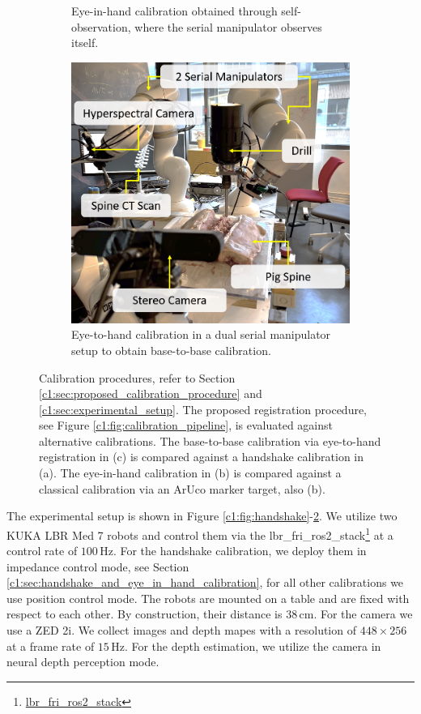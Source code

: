 \begin{figure}
\begin{subfigure}[b]{0.3\textwidth}
         \caption{Eye-in-hand calibration obtained through self-observation, where the serial manipulator observes itself.}
         \label{c1:fig:eye_in_hand}
     \end{subfigure}
     \hfill
     \begin{subfigure}[b]{0.3\textwidth}
         \centering
         \includegraphics[width=\textwidth]{fig/eye_to_hand.png}
         \caption{Eye-to-hand calibration in a dual serial manipulator setup to obtain base-to-base calibration.}
         \label{c1:fig:eye_to_hand}
     \end{subfigure}
    \caption{Calibration procedures, refer to Section \ref{c1:sec:proposed_calibration_procedure} and \ref{c1:sec:experimental_setup}. The proposed registration procedure, see Figure \ref{c1:fig:calibration_pipeline}, is evaluated against alternative calibrations. The base-to-base calibration via eye-to-hand registration in (c) is compared against a handshake calibration in (a). The eye-in-hand calibration in (b) is compared against a classical calibration via an ArUco marker target, also (b).}
    \label{c1:fig:calibrations}
\end{figure}

The experimental setup is shown in Figure \ref{c1:fig:handshake}-\ref{c1:fig:eye_to_hand}. We utilize two KUKA LBR Med 7 robots and control them via the lbr\_fri\_ros2\_stack\footnote{\href{https://github.com/kCL-BMEIS/lbr_fri_ros2_stack}{lbr\_fri\_ros2\_stack}} at a control rate of $100\,\text{Hz}$. For the handshake calibration, we deploy them in impedance control mode, see Section \ref{c1:sec:handshake_and_eye_in_hand_calibration}, for all other calibrations we use position control mode. The robots are mounted on a table and are fixed with respect to each other. By construction, their distance is $38\,\text{cm}$. For the camera we use a ZED 2i. We collect images and depth mapes with a resolution of $448 \times 256$ at a frame rate of $15\,\text{Hz}$. For the depth estimation, we utilize the camera in neural depth perception mode.

